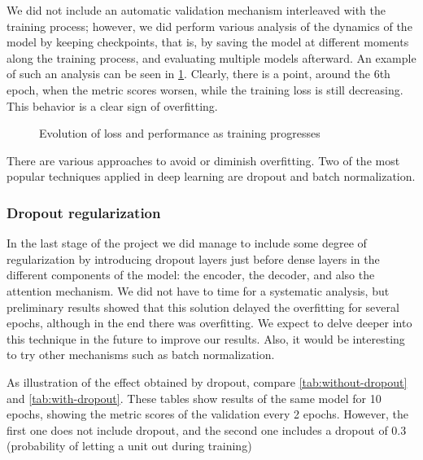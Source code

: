 We did not include an automatic validation mechanism interleaved with the training process; however, we did perform various analysis of the dynamics of the model by keeping checkpoints, that is, by saving the model at different moments along the training process, and evaluating multiple models afterward. An example of such an analysis can be seen in \cref{fig:training_evolution}. Clearly, there is a point, around the 6th epoch, when the metric scores worsen, while the training loss is still decreasing. This behavior is a clear sign of overfitting.


\begin{figure}[hpt]
    \centering
    
    \caption{Evolution of loss and performance as training progresses}
    \label{fig:training_evolution}
\end{figure}

There are various approaches to avoid or diminish overfitting. Two of the most popular techniques applied in deep learning are dropout and batch normalization.

\subsubsection{Dropout regularization}

In the last stage of the project we did manage to include some degree of regularization by introducing dropout layers just before dense layers in the different components of the model: the encoder, the decoder, and also the attention mechanism. We did not have to time for a systematic analysis, but preliminary results showed that this solution delayed the overfitting for several epochs, although in the end there was overfitting. 
We expect to delve deeper into this technique in the future to improve our results. Also, it would be interesting to try other mechanisms such as batch normalization.

As illustration of the effect obtained by dropout, compare \cref{tab:without-dropout} and \cref{tab:with-dropout}. These tables show results of the same model for 10 epochs, showing the metric scores of the validation every 2 epochs. However, the first one does not include dropout, and the second one includes a dropout of 0.3 (probability of letting a unit out during training)

